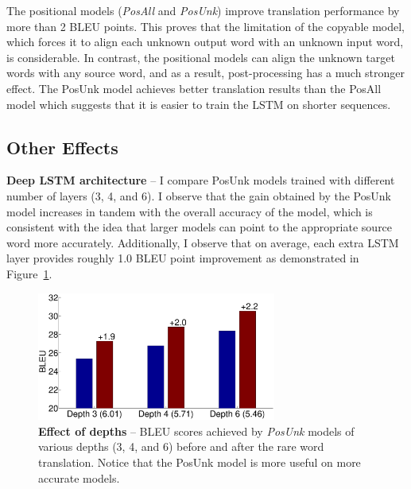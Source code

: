 The positional models ({\it PosAll} and {\it PosUnk}) 
improve translation performance by more than 2 BLEU points. 
This proves that the limitation of the copyable model, which forces
it to align each unknown output word with an unknown input word, is considerable.  
In contrast, the positional models can align the unknown target words with any source word,
and as a result, post-processing has a much stronger effect. 
The PosUnk model achieves better translation results than
the PosAll model which suggests that it is easier to train the LSTM on shorter sequences. 

\subsection{Other Effects}
\label{subsec:effects}
{\bf Deep LSTM architecture} --  I compare PosUnk models trained with different number of layers (3, 4, and 6). 
I observe that the gain obtained by the PosUnk model increases in tandem with the overall accuracy of the model, which is consistent 
with the idea that larger models can point to the appropriate source word more accurately.
Additionally, I observe that on average, each extra LSTM layer provides roughly 1.0 BLEU point improvement as demonstrated in Figure~\ref{f:depth}. 

\begin{figure}[tbh!]
\centering
\includegraphics[width=0.7\textwidth, clip=true, trim= 0 0 0 0]{img/3-depth}
\caption[Effect of depths]{{\bf Effect of depths} -- BLEU scores achieved by {\it PosUnk} models of various depths (3, 4, and 6) before and after the rare word translation. 
 Notice that the PosUnk model is more useful on more accurate models. }
\label{f:depth}
\end{figure}

